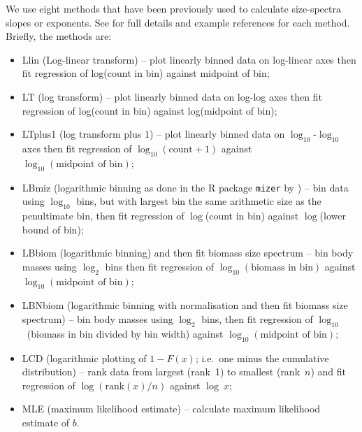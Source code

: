\documentclass[12pt, letter]{article}
\newcommand{\logten}{\log_{\mathrm{10}}}
\newcommand{\logtwo}{\log_{\mathrm{2}}}
\newcommand{\MEE}{erpbb17}     %
\begin{document}
We use eight methods that have been previously used to calculate size-spectra
slopes or exponents. See \citet{\MEE} for full details and example references for each method.
Briefly, the methods are:
\begin{itemize}
  \item Llin (Log-linear transform) -- plot linearly binned data on
log-linear axes then fit regression of log(count in bin) against midpoint of
bin;
  \item LT (log transform) -- plot linearly binned data on log-log axes then fit
regression of log(count in bin) against log(midpoint of bin);
%
\item LTplus1 (log transform plus 1) -- plot linearly binned data on
$\logten$-$\logten$ axes then fit regression of $\logten (\mbox{count}+1)$
against $\logten (\mbox{midpoint of bin})$;
%
\item LBmiz (logarithmic binning as done in the R package {\tt mizer} by
\citealt{sba14}) -- bin data using $\logten$ bins, but with largest bin the same
arithmetic size as the penultimate bin, then fit regression of $\log$(count in
bin) against $\log$(lower bound of bin);
%
\item LBbiom (logarithmic binning) and then fit biomass size spectrum -- bin body
masses using $\logtwo$ bins then fit regression of
$\logten (\mbox{biomass in bin})$ against $\logten (\mbox{midpoint of bin})$;
%
\item LBNbiom (logarithmic binning with normalisation and then fit biomass size
spectrum) -- bin body masses using $\logtwo$ bins, then fit regression of
$\logten$~(biomass in bin divided by bin width) against $\logten
(\mbox{midpoint of bin})$;
%
\item LCD (logarithmic plotting of $1 - F(x)$; i.e.~one minus the cumulative
distribution) -- rank data from largest (rank~1) to smallest (rank~$n$) and fit
regression of $\log(\mbox{rank}(x) / n)$ against $\log~x$;
%
\item MLE (maximum likelihood estimate) -- calculate maximum likelihood estimate of
$b$.
\end{itemize}
\end{document}
